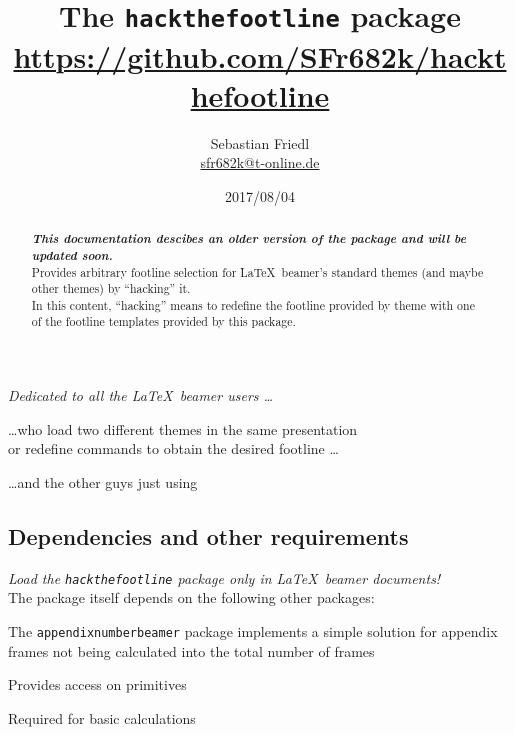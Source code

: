\documentclass[11pt]{ltxdoc}
\title{The \texttt{\bfseries hackthefootline} package \\ {\large\url{https://github.com/SFr682k/hackthefootline}}}
\author{Sebastian Friedl \\ \href{mailto:sfr682k@t-online.de}{\ttfamily sfr682k@t-online.de}}
\date{2017/08/04}
\begin{document}
	\maketitle
	\thispagestyle{empty}
	
	\begin{center} \itshape
		Dedicated to all the \LaTeX\ beamer users \dots
		
		\medskip
		\dots who load two different themes in the same presentation \\ or redefine commands to obtain the desired footline \dots
		
		\medskip
		\dots and the other guys just using \texttt{}
	\end{center}
	
	\medskip
	\begin{abstract}
		\noindent%
		\textbf{\itshape\color{red} This documentation descibes an older version of the package and will be updated soon.} \\
		Provides arbitrary footline selection for \LaTeX\ beamer's standard themes (and maybe other themes) by \enquote{hacking} it. \\
		In this content, \enquote{hacking} means to redefine the footline provided by theme with one of the footline templates provided by this package.
	\end{abstract}
	
	
	\tableofcontents
	
	\clearpage
	


	\subsection*{Dependencies and other requirements}
	\emph{Load the \texttt{hackthefootline} package only in \LaTeX\ beamer documents!} \\
	The package itself depends on the following other packages:
	
	\medskip
	The \texttt{appendixnumberbeamer} package implements a simple solution for appendix frames not being calculated into the total number of frames
	
	\medskip
	Provides access on  primitives
	
	\medskip
	Required for basic calculations
\end{document}
